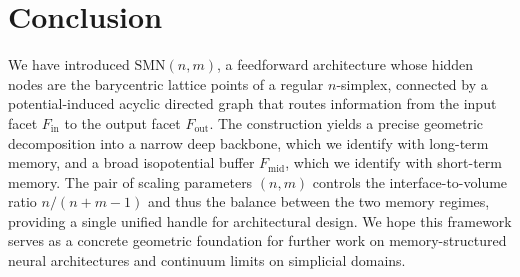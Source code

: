 \section{Conclusion}
\label{sec:conclusion}

We have introduced $\mathrm{SMN}(n,m)$, a feedforward architecture whose hidden nodes are the barycentric lattice points of a regular $n$-simplex, connected by a potential-induced acyclic directed graph that routes information from the input facet $F_{\mathrm{in}}$ to the output facet $F_{\mathrm{out}}$.  The construction yields a precise geometric decomposition into a narrow deep backbone, which we identify with long-term memory, and a broad isopotential buffer $F_{\mathrm{mid}}$, which we identify with short-term memory.  The pair of scaling parameters $(n,m)$ controls the interface-to-volume ratio $n/(n+m-1)$ and thus the balance between the two memory regimes, providing a single unified handle for architectural design.  We hope this framework serves as a concrete geometric foundation for further work on memory-structured neural architectures and continuum limits on simplicial domains.
